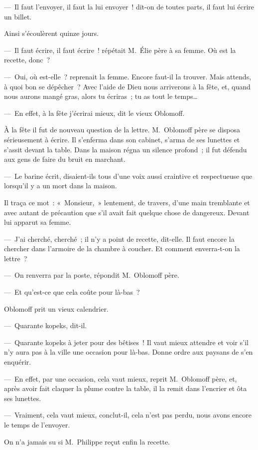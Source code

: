 \documentclass[french,twoside]{book} %
\begin{document}
— Il faut l’envoyer, il faut la lui envoyer ! dit-on de toutes parts, il faut lui écrire un billet.\par
Ainsi s’écoulèrent quinze jours.\par
— Il faut écrire, il faut écrire ! répétait M. Élie père à sa femme. Où est la recette, donc ?\par
— Oui, où est-elle ? reprenait la femme. Encore faut-il la trouver. Mais attends, à quoi bon se dépêcher ? Avec l’aide de Dieu nous arriverons à la fête, et, quand nous aurons mangé gras, alors tu écriras ; tu as tout le temps…\par
— En effet, à la fête j’écrirai mieux, dit le vieux Oblomoff.\par
À la fête il fut de nouveau question de la lettre. M. Oblomoff père se disposa sérieusement à écrire. Il s’enferma dans son cabinet, s’arma de ses lunettes et s’assit devant la table. Dans la maison régna un silence profond ; il fut défendu aux gens de faire du bruit en marchant.\par
— Le barine écrit, disaient-ils tous d’une voix aussi craintive et respectueuse que lorsqu’il y a un mort dans la maison.\par
Il traça ce mot : « Monsieur, » lentement, de travers, d’une main tremblante et avec autant de précaution que s’il avait fait quelque chose de dangereux. Devant lui apparut sa femme.\par
— J’ai cherché, cherché ; il n’y a point de recette, dit-elle. Il faut encore la chercher dans l’armoire de la chambre à coucher. Et comment enverra-t-on la lettre ?\par
— On renverra par la poste, répondit M. Oblomoff père.\par
— Et qu’est-ce que cela coûte pour là-bas ?\par
Oblomoff prit un vieux calendrier.\par
— Quarante kopeks, dit-il.\par
— Quarante kopeks à jeter pour des bêtises ! Il vaut mieux attendre et voir s’il n’y aura pas à la ville une occasion pour là-bas. Donne ordre aux paysans de s’en enquérir.\par
— En effet, par une occasion, cela vaut mieux, reprit M. Oblomoff père, et, après avoir fait claquer la plume contre la table, il la remit dans l’encrier et ôta ses lunettes.\par
— Vraiment, cela vaut mieux, conclut-il, cela n’est pas perdu, nous avons encore le temps de l’envoyer.\par
On n’a jamais su si M. Philippe reçut enfin la recette.\par
\end{document}
